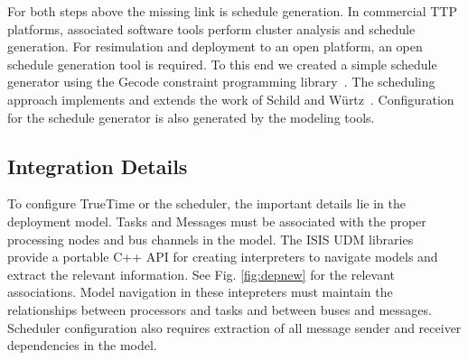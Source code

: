 For both steps above the missing link is schedule generation.  In commercial TTP platforms, associated software tools perform cluster analysis and schedule generation.  For resimulation and deployment to an open platform, an open schedule generation tool is required.  To this end we created a simple schedule generator using the Gecode constraint programming library~\cite{gecode}.  The scheduling approach implements and extends the work of Schild and W{\"u}rtz~\cite{sw:offlinescheduling}.  Configuration for the schedule generator is also generated by the modeling tools.

\subsection{Integration Details}

To configure TrueTime or the scheduler, the important details lie in the deployment model.  Tasks and Messages must be associated with the proper processing nodes and bus channels in the model.  The ISIS UDM libraries~\cite{UDM} provide a portable C++ API for creating interpreters to navigate models and extract the relevant information.  See Fig. \ref{fig:depnew} for the relevant associations.  Model navigation in these intepreters must maintain the relationships between processors and tasks and between buses and messages.  Scheduler configuration also requires extraction of all message sender and receiver dependencies in the model.


